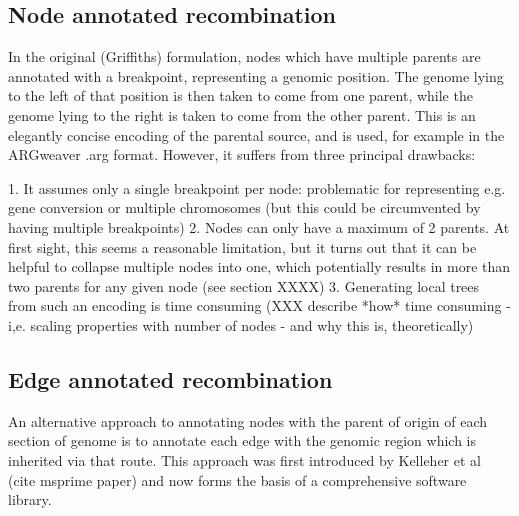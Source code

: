 \documentclass{article}
\begin{document}
\subsection*{Node annotated recombination}

In the original (Griffiths) formulation, nodes which have multiple parents are
annotated with a breakpoint, representing a genomic position. The genome
lying to the left of that position is then taken to come from one parent, while
the genome lying to the right is taken to come from the other parent. This is
an elegantly concise encoding of the parental source, and is used, for example
in the ARGweaver .arg format. However, it suffers from three principal
drawbacks:


1. It assumes only a single breakpoint per node: problematic for representing
e.g. gene conversion or multiple chromosomes (but this could be circumvented by
having multiple breakpoints)
2. Nodes can only have a maximum of 2 parents. At
first sight, this seems a reasonable limitation, but it turns out that it can
be helpful to collapse multiple nodes into one, which potentially results in
more than two parents for any given node (see section XXXX)
3. Generating local
trees from such an encoding is time consuming (XXX describe *how* time
consuming - i,e. scaling properties with number of nodes - and why this is,
theoretically)

\subsection*{Edge annotated recombination}

An alternative approach to annotating nodes with the parent of origin of each
section of genome is to annotate each edge with the genomic region which is
inherited via that route. This approach was first introduced by Kelleher et al
(cite msprime paper) and now forms the basis of a comprehensive software
library.

\end{document}
